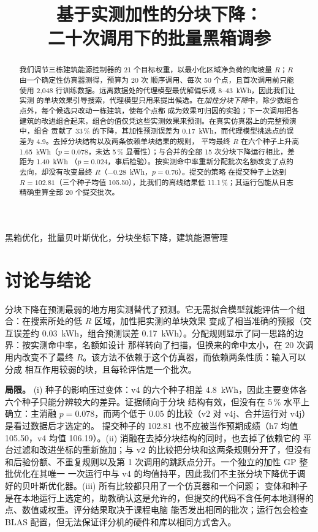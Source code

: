 \documentclass[conference]{IEEEtran}
\title{基于实测加性的分块下降：\\二十次调用下的批量黑箱调参}
\author{\IEEEauthorblockN{张子木、刘润泽、艾子齐、胡馨澜、武韵扬}
\IEEEauthorblockA{SDM374 机器学习系统设计，南方科技大学}}
\begin{document}
\maketitle

\begin{abstract}
我们调节三栋建筑能源控制器的 21 个目标权重，以最小化区域净负荷的爬坡量 $R$；$R$ 由一个确定性仿真器测得，预算为 20 次
顺序调用、每次 50 个点，且首次调用前只能使用 2,048 行训练数据。远离数据处的代理模型最优解偏乐观 8--43~kWh，因此我们让实测
的单块效果引导搜索，代理模型只用来提出候选。在\emph{加性分块下降}中，除少数组合点外，每个候选只改动一栋建筑，使每个点都
成为效果可归因的实验；下一次调用把各建筑的改进组合起来，组合的值仅凭这些实测效果来预测。在真实仿真器上的完整预演中，组合
贡献了 33\,\% 的下降，其加性预测误差为 0.17~kWh，而代理模型挑选点的误差为 4.9。去掉分块结构以及两条依赖单块结果的规则，
平均最终 $R$ 在六个种子上升高 1.65~kWh（$p=0.078$，未达 5\,\% 显著性）；与合并的全部 15 次分块下降运行相比，差距为 1.40~kWh
（$p=0.024$，事后检验）。按实测命中率重新分配批次名额改变了点的去向，却没有改变最终 $R$（$-0.28$~kWh，$p=0.76$）。提交的策略
在提交种子上达到 $R=102.81$（三个种子均值 105.50），比我们的离线结果低 11.1\,\%；其运行包能从日志精确重算全部 20 个提交批次。
\end{abstract}

\begin{IEEEkeywords}
黑箱优化，批量贝叶斯优化，分块坐标下降，建筑能源管理
\end{IEEEkeywords}






\section{讨论与结论}
\label{sec:discussion}
分块下降在预测最弱的地方用实测替代了预测。它无需拟合模型就能评估一个组合：在搜索所处的低 $R$ 区域，加性把实测的单块效果
变成了相当准确的预报（交互误差约 0.03~kWh，组合预测误差 0.17~kWh）。分配规则显示了同一思路的边界：按实测命中率，名额如设计
那样转向了扫描，但换来的命中太小，在 20 次调用内改变不了最终 $R$。该方法不依赖于这个仿真器，而依赖两条性质：输入可以分成
相互作用较弱的块，且每轮评估是一个批次。

\textbf{局限。} (i) 种子的影响压过变体：v4 的六个种子相差 4.8~kWh，因此主要变体各六个种子只能分辨较大的差异。证据倾向于分块
结构有效，但没有在 5\,\% 水平上确立：主消融 $p=0.078$，而两个低于 0.05 的比较（v2 对 v4j、合并运行对 v4j）是看过数据后才选定的。
提交种子的 102.81 也不应被当作预期成绩（h7 均值 105.50，v4 均值 106.19）。(ii) 消融在去掉分块结构的同时，也去掉了依赖它的
平台过滤和改进坐标的重新施加；与 v2 的比较把分块和这两条规则分开了，但没有和后验份额、不重复规则以及第 1 次调用的跳跃点分开。一个独立的加性 GP 整批优化在其唯一
一次运行中与 v4 的均值持平，因此我们不主张分块下降优于调好的贝叶斯优化器。(iii) 所有比较都只用了一个仿真器和一个问题；
变体和种子是在本地运行上选定的，助教确认这是允许的，但提交的代码不含任何本地测得的点、数值或权重。评分结果取决于课程电脑
能否发出相同的批次；运行包会检查 BLAS 配置，但无法保证评分机的硬件和库以相同方式舍入。
\end{document}
